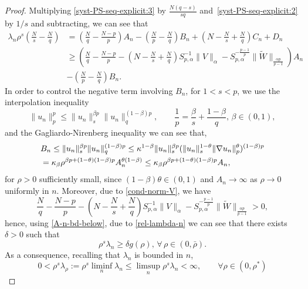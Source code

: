 \documentclass[10pt,a4paper]{amsart}
\begin{document}
\begin{proof}
Multiplying \eqref{syst-PS-seq-explicit:3} by $\frac{N(q-s)}{sq}$ and~\eqref{syst-PS-seq-explicit:2} by $1/s$ and subtracting, we can see that
\begin{equation}\label{rel-lambda-n}
\begin{aligned}
\lambda_n\rho^s\left(\frac{N}{s}-\frac{N}{q}\right)&=\left(\frac{N}{q}-\frac{N-p}{p}\right)A_n -\left(\frac{N}{p}-\frac{N}{q}\right)B_n +\left(N-\frac{N}{s}+\frac{N}{q}\right)C_n +D_n \\
&\ge\left(\frac{N}{q}-\frac{N-p}{p}-\left(N-\frac{N}{s}+\frac{N}{q}\right)S_{p,\alpha}^{-1}\|V\|_{\alpha} - S_{p,\alpha}^{-\frac{p-1}{p}}\|\tilde{W}\|_{\frac{\alpha p}{p-1}}\right)A_n\\
&-\left(\frac{N}{p}-\frac{N}{q}\right)B_n .
\end{aligned}
\end{equation}
In order to control the negative term involving $B_n$, for $1<s<p$, we use the interpolation inequality $$\|u_n\|^p_p\le\|u_n\|_s^{\beta p}\|u_n\|_q^{(1-\beta)p},\qquad\frac{1}{p}=\frac{\beta}{s}+\frac{1-\beta}{q},\,\beta\in(0,1),$$
and the Gagliardo-Nirenberg inequality we can see that,
\begin{equation}\notag
\begin{aligned}
&B_n\le \|u_n\|_s^{\beta p}\|u_n\|_q^{(1-\beta)p}
\le \kappa^{1-\beta} \|u_n\|_s^{\beta p}(\|u_n\|_s^{1-\theta}\|\nabla u_n\|_p^\theta)^{(1-\beta)p}
\\
&=\kappa_{\beta}\rho^{\beta p+(1-\theta)(1-\beta)p}A_n^{\theta (1-\beta)}
\le \kappa_{\beta}\rho^{\beta p+(1-\theta)(1-\beta)p}A_n,   
\end{aligned}
\end{equation}
for $\rho>0$ sufficiently small, since $(1-\beta)\theta\in(0,1)$ and $A_n\to\infty$ %
as $\rho\to 0$ uniformly in $n$. Moreover, due to \eqref{cond-norm-V}, we have 
$$\frac{N}{q}-\frac{N-p}{p}-\left(N-\frac{N}{s}+\frac{N}{q}\right)S_{p,\alpha}^{-1}\|V\|_{\alpha} - S_{p,\alpha}^{-\frac{p-1}{p}}\|\tilde{W}\|_{\frac{\alpha p}{p-1}}>0,$$
hence, using \eqref{A-n-bd-below}, due to \eqref{rel-lambda-n} we can see that there exists $\delta>0$ such that 
\begin{equation}
\rho^s\lambda_n\ge \delta g(\rho),\,\forall\,\rho\in(0,\bar{\rho}).
\end{equation}
As a consequence, recalling that $\lambda_n$ is bounded in $n$,
\begin{equation}\label{lim:lag:mult}
0<\rho^s\lambda_{\rho}:=\rho^s\liminf_n \lambda_n\le \limsup_n \rho^s\lambda_n<\infty,\qquad\forall \rho\in(0,\rho^*)    

\end{equation}
\end{proof}
\end{document}
